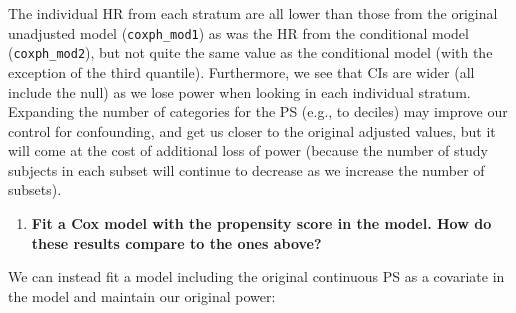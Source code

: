 \documentclass[
]{book}
\newenvironment{Shaded}{\begin{snugshade}}{\end{snugshade}}
\newcommand{\DataTypeTok}[1]{\textcolor[rgb]{0.13,0.29,0.53}{#1}}
\newcommand{\FloatTok}[1]{\textcolor[rgb]{0.00,0.00,0.81}{#1}}
\newcommand{\KeywordTok}[1]{\textcolor[rgb]{0.13,0.29,0.53}{\textbf{#1}}}
\newcommand{\NormalTok}[1]{#1}
\newcommand{\OperatorTok}[1]{\textcolor[rgb]{0.81,0.36,0.00}{\textbf{#1}}}
\newcommand{\StringTok}[1]{\textcolor[rgb]{0.31,0.60,0.02}{#1}}
\providecommand{\tightlist}{%
  \setlength{\itemsep}{0pt}\setlength{\parskip}{0pt}}
\begin{document}
The individual HR from each stratum are all lower than those from the original unadjusted model (\texttt{coxph\_mod1}) as was the HR from the conditional model (\texttt{coxph\_mod2}), but not quite the same value as the conditional model (with the exception of the third quantile). Furthermore, we see that CIs are wider (all include the null) as we lose power when looking in each individual stratum. Expanding the number of categories for the PS (e.g., to deciles) may improve our control for confounding, and get us closer to the original adjusted values, but it will come at the cost of additional loss of power (because the number of study subjects in each subset will continue to decrease as we increase the number of subsets).

\begin{enumerate}
\def\labelenumi{\arabic{enumi}.}
\setcounter{enumi}{1}
\tightlist
\item
  \textbf{Fit a Cox model with the propensity score in the model. How do these results compare to the ones above?}
\end{enumerate}

We can instead fit a model including the original continuous PS as a covariate in the model and maintain our original power:

\begin{Shaded}
\end{Shaded}
\end{document}
